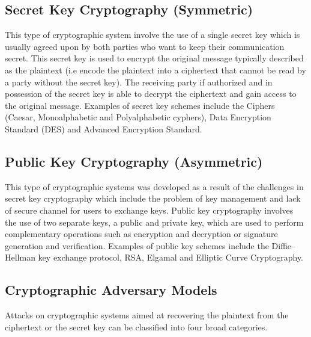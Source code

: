 \subsection{Secret Key Cryptography (Symmetric)} This type of cryptographic system involve the use of a single secret key which is usually agreed upon by both parties who want to keep their communication secret. This secret key is used to encrypt the original message typically described as the plaintext (i.e encode the plaintext into a ciphertext that cannot be read by a party without the secret key). The receiving party if authorized and in possession of the secret key is able to decrypt the ciphertext and gain access to the original message. Examples of secret key schemes include the Ciphers (Caesar, Monoalphabetic and Polyalphabetic cyphers), Data Encryption Standard (DES) and Advanced Encryption Standard. 

\subsection{Public Key Cryptography (Asymmetric)} This type of cryptographic systems was developed as a result of the challenges in secret key cryptography which include the problem of key management and lack of secure channel for users to exchange keys. Public key cryptography involves the use of two separate keys, a public and private key, which are used to perform complementary operations such as encryption and decryption or signature generation and verification. Examples of public key schemes include the Diffie–Hellman key exchange protocol, RSA, Elgamal and Elliptic Curve Cryptography.

\subsection{Cryptographic Adversary Models}

Attacks on cryptographic systems aimed at recovering the plaintext from the ciphertext or the secret key can be classified into four broad categories.


